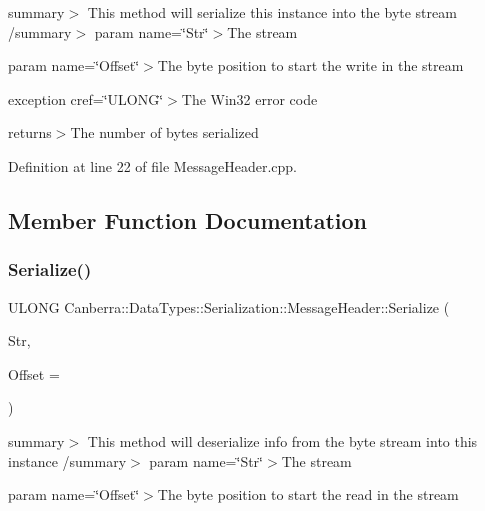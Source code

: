 summary$>$ This method will serialize this instance into the byte stream /summary$>$ param name=\char`\"{}\+Str\char`\"{}$>$The stream

param name=\char`\"{}\+Offset\char`\"{}$>$The byte position to start the write in the stream

exception cref=\char`\"{}\+U\+L\+O\+N\+G\char`\"{}$>$The Win32 error code

returns$>$The number of bytes serialized

Definition at line 22 of file Message\+Header.\+cpp.



\subsection{Member Function Documentation}
\mbox{\label{class_canberra_1_1_data_types_1_1_serialization_1_1_message_header_a862c47b37152bb3cce530584e3a9feb4_a862c47b37152bb3cce530584e3a9feb4}} 
\subsubsection{\texorpdfstring{Serialize()}{Serialize()}}
{\footnotesize\ttfamily U\+L\+O\+NG Canberra\+::\+Data\+Types\+::\+Serialization\+::\+Message\+Header\+::\+Serialize (\begin{DoxyParamCaption}\item[{\hyperlink{class_canberra_1_1_utility_1_1_core_1_1_byte_stream}{Canberra\+::\+Utility\+::\+Core\+::\+Byte\+Stream} \&}]{Str,  }\item[{const L\+O\+NG}]{Offset = {} }\end{DoxyParamCaption})\hspace{0.3cm}{\ttfamily [virtual]}}

summary$>$ This method will deserialize info from the byte stream into this instance /summary$>$ param name=\char`\"{}\+Str\char`\"{}$>$The stream

param name=\char`\"{}\+Offset\char`\"{}$>$The byte position to start the read in the stream

